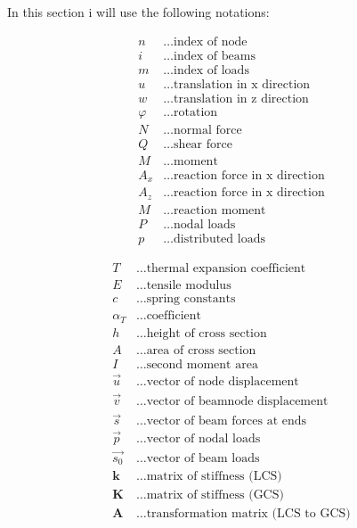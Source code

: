 In this section i will use the following notations:\\
\begin{minipage}[h]{0.5\textwidth-0.5cm}
\begin{align*}
n &\dots \text{index of node}\\
i &\dots \text{index of beams}\\
m &\dots \text{index of loads}\\
u &\dots \text{translation in x direction}\\
w &\dots \text{translation in z direction}\\
\varphi &\dots \text{rotation}\\
N &\dots \text{normal force}\\
Q &\dots \text{shear force}\\
M &\dots \text{moment}\\
A_x &\dots \text{reaction force in x direction}\\
A_z &\dots \text{reaction force in x direction}\\
M &\dots \text{reaction moment}\\
P &\dots \text{nodal loads}\\
p &\dots \text{distributed loads}
\end{align*}
\end{minipage}
\hfill
\begin{minipage}[h]{0.5\textwidth-0.5cm}
\begin{align*}
T &\dots \text{thermal expansion coefficient}\\
E &\dots \text{tensile modulus}\\
c &\dots \text{spring constants}\\
\alpha_T &\dots \text{coefficient}\\
h &\dots \text{height of cross section}\\
A &\dots \text{area of cross section}\\
I &\dots \text{second moment area}\\
\vec{u}&\dots \text{vector of node displacement}\\
\vec{v}&\dots \text{vector of beamnode displacement}\\
\vec{s}&\dots \text{vector of beam forces at ends}\\
\vec{p}&\dots \text{vector of nodal loads}\\
\vec{s_0}&\dots \text{vector of beam loads}\\
\textbf{k}&\dots \text{matrix of stiffness (LCS)}\\
\textbf{K}&\dots \text{matrix of stiffness (GCS)}\\
\textbf{A}&\dots \text{transformation matrix (LCS to GCS)}
\end{align*}
\end{minipage}\\

